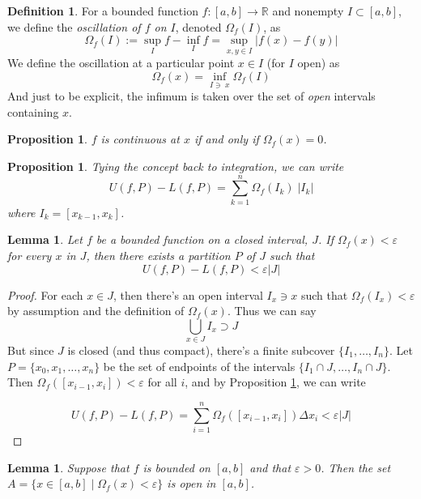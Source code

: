 \documentclass[12pt]{article}
\theoremstyle{plain}
\newtheorem{lem}[thm]{Lemma}
\newtheorem{prop}[thm]{Proposition}
\theoremstyle{definition}
\newtheorem{defn}[thm]{Definition}
\theoremstyle{remark}
\begin{document}
\begin{defn} 
For a bounded function $f:[a,b]\rightarrow\mathbb{R}$ and nonempty $I\subset[a,b]$, we define the \emph{oscillation of $f$ on $I$}, denoted $\Omega_f(I)$, as
\[
    \Omega_f(I) := \sup_I f - \inf_I f 
    = \sup_{x,y\in I} |f(x)-f(y)|
\]
We define the oscillation at a particular point $x\in I$ (for $I$ open) as 
\[
\Omega_f(x) = \inf_{I\ni \; x} \Omega_f(I)
\]
And just to be explicit, the infimum is taken over the set of \emph{open} intervals containing $x$.
\end{defn}

\begin{prop}
\label{osccts}
$f$ is continuous at $x$ if and only if $\Omega_f(x)=0$.
\end{prop}

\begin{prop}
\label{rewriteuml}
Tying the concept back to integration, we can write 
\[
    U(f,P)-L(f,P) 
    = \sum^n_{k=1} \Omega_f(I_k) \; |I_k|
\]
where $I_k = [x_{k-1}, x_k]$.
\end{prop}

\begin{lem}
    \label{leblem}
Let $f$ be a bounded function on a closed interval, $J$. If $\Omega_f(x) < \varepsilon$ for every $x$ in $J$, then there exists a partition $P$ of $J$ such that 
\[
    U(f,P)- L(f,P) < \varepsilon |J|
\]
\end{lem}

\begin{proof}
For each $x\in J$, then there's an open interval $I_x \ni x$ such that $\Omega_f(I_x)<\varepsilon$ by assumption and the definition of $\Omega_f(x)$. Thus we can say 
\[
    \bigcup_{x\in J} I_x \supset J
\]
But since $J$ is closed (and thus compact), there's a finite subcover $\{I_1, \ldots, I_n\}$. Let $P=\{x_0, x_1, \ldots, x_n\}$ be the set of endpoints of the intervals $\{I_1\cap J, \ldots, I_n\cap J\}$. Then $\Omega_f([x_{i-1},x_i])<\varepsilon$ for all $i$, and by Proposition \ref{rewriteuml}, we can write
 
\[
    U(f,P)- L(f,P) = \sum^n_{i=1} \Omega_f([x_{i-1}, x_i]) \Delta 
    x_i < \varepsilon |J|
\]
\end{proof}

\begin{lem}
\label{leblem2}
Suppose that $f$ is bounded on $[a,b]$ and that $\varepsilon>0$. Then the set $A = \{x \in [a,b] \; | \; \Omega_f(x) < \varepsilon \}$ is open in $[a,b]$.
\end{lem}
\end{document}
